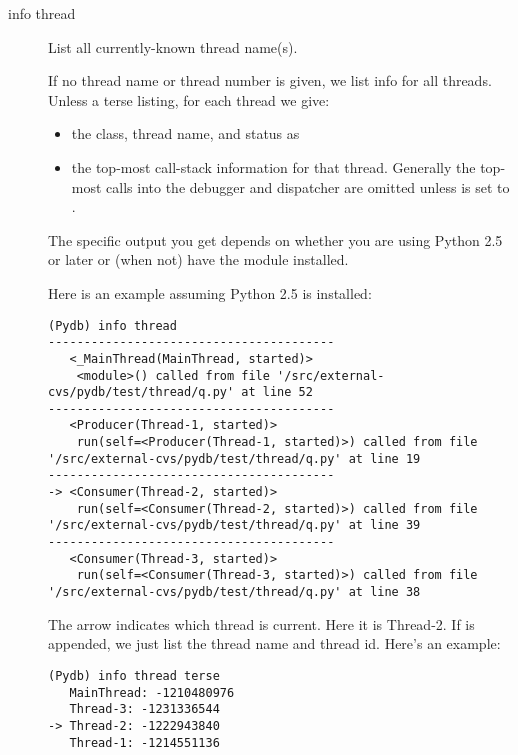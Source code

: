 \begin{description}
\item[info thread 
  ]

List all currently-known thread name(s).

If no thread name or thread number is given, we list info for all
threads. Unless a terse listing, for each thread we give:

\begin{itemize}
\item the class, thread name, and status as 
\item the top-most call-stack information for that thread. Generally
    the top-most calls into the debugger and dispatcher are omitted unless
     is set to .
\end{itemize}

The specific output you get depends on whether you are using Python
2.5 or later or (when not) have the  module installed. 

Here is an example assuming Python 2.5 is installed:

\begin{verbatim}
(Pydb) info thread 
----------------------------------------
   <_MainThread(MainThread, started)>
    <module>() called from file '/src/external-cvs/pydb/test/thread/q.py' at line 52
----------------------------------------
   <Producer(Thread-1, started)>
    run(self=<Producer(Thread-1, started)>) called from file '/src/external-cvs/pydb/test/thread/q.py' at line 19
----------------------------------------
-> <Consumer(Thread-2, started)>
    run(self=<Consumer(Thread-2, started)>) called from file '/src/external-cvs/pydb/test/thread/q.py' at line 39
----------------------------------------
   <Consumer(Thread-3, started)>
    run(self=<Consumer(Thread-3, started)>) called from file '/src/external-cvs/pydb/test/thread/q.py' at line 38
\end{verbatim}

The arrow \code{->} indicates which thread is current.  Here it is
Thread-2.  If  is appended, we just list the thread name
and thread id. Here's an example:

\begin{verbatim}
(Pydb) info thread terse
   MainThread: -1210480976
   Thread-3: -1231336544
-> Thread-2: -1222943840
   Thread-1: -1214551136
\end{verbatim}


\end{description}
